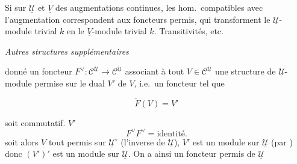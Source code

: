 \documentclass[11pt,a4paper]{article}
\begin{document}

Si \ill{} sur $\underline{\mathcal{U}}$ et $\underline{V}$ des augmentations
continues, les hom.\ compatibles avec l'augmentation correspondent aux foncteurs
permis, qui transforment le $\underline{\mathcal{U}}$-module trivial $k$ en le
$\underline{V}$-module trivial $k$. Transitivités, etc.

\struck{\ill{}}

\emph{Autres structures supplémentaires}

\struck{\ill{}} \ill{} donné un foncteur
$F^{\vee} : \mathcal{C}^{\underline{\mathcal{U}}} \to
\mathcal{C}^{\underline{\mathcal{U}}}$ \struck{\ill{}} associant à tout
$V \in \mathcal{C}^{\underline{\mathcal{U}}}$ une structure de
$\underline{\mathcal{U}}$-module permise sur le dual $V'$ de $V$,
 i.e.\ un foncteur tel que


\[ \check{F}(V) = V' \]

soit commutatif. \struck{\ill{}} $V'$  \struck{\ill{}} 
\[ F^{\vee} F^{\vee} = \text{identité} . \]
\struck{\ill{}} soit alors $V$ \ill{} tout \ill{} permis sur
$\underline{\mathcal{U}}^{\circ}$ (l'inverse de $\underline{\mathcal{U}}$), $V'$
est un module sur $\underline{\mathcal{U}}$ (par \ill{}) donc $(V')'$ est un
module sur $\underline{\mathcal{U}}$. On a ainsi un \struck{\ill{}} foncteur
permis de $\underline{\mathcal{U}}$ \ill{}

\end{document}
